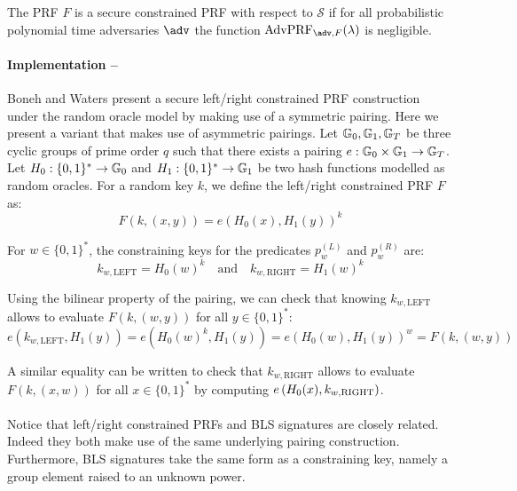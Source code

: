 		\begin{definition}
			The PRF $F$ is a secure constrained PRF with respect to $\mathcal{S}$ if for all probabilistic
polynomial time adversaries $\adv$ the function $\mathrm{AdvPRF}_{\adv,F}(\lambda)$ is negligible.
		\end{definition}




\paragraph{Implementation --} \label{leftright} Boneh and Waters \cite{LRPRF} present a secure left/right constrained PRF construction under the random oracle model by making use of a symmetric pairing. Here we present a variant that makes use of asymmetric pairings. Let $\mathbb{G}_0, \mathbb{G}_1, \mathbb{G}_T$ be three cyclic groups of prime order $q$ such that there exists a pairing $e : \mathbb{G}_0 \times \mathbb{G}_1 \rightarrow \mathbb{G}_T$. Let $H_0: \{0,1\}^* \rightarrow \mathbb{G}_0$ and $H_1: \{0,1\}^* \rightarrow \mathbb{G}_1$ be two hash functions modelled as random oracles. For a random key $k$, we define the left/right constrained PRF $F$ as:
\begin{equation}
	\label{eq:LRPRF}
	F(k, (x,y)) = e(H_0(x), H_1(y))^k
\end{equation}

For $w \in \{0,1\}^*$, the constraining keys for the predicates $p_w^{(L)}$ and  $p_w^{(R)}$ are:
\begin{equation}
\label{eq:constrkeys}
	k_{w,\mathrm{LEFT}} = H_0(w)^k \quad \mathrm{and} \quad k_{w,\mathrm{RIGHT}} = H_1(w)^k
\end{equation}

Using the bilinear property of the pairing, we can check that knowing $k_{w,\mathrm{LEFT}}$ allows to evaluate $F(k, (w,y))$ for all $y \in \{0,1\}^*$:
\begin{equation}
	e(k_{w,\mathrm{LEFT}}, H_1(y)) = e(H_0(w)^k, H_1(y)) = e(H_0(w), H_1(y))^w = F(k, (w,y))
\end{equation}

\noindent A similar equality can be written to check that $k_{w,\mathrm{RIGHT}}$ allows to evaluate $F(k, (x,w))$ for all $x \in \{0,1\}^*$ by computing $e\left(H_0(x), k_{w,\mathrm{RIGHT}} \right)$.


\paragraph{} Notice that left/right constrained PRFs and BLS signatures are closely related. Indeed they both make use of the same underlying pairing construction. Furthermore, BLS signatures take the same form as a constraining key, namely a group element raised to an unknown power.








